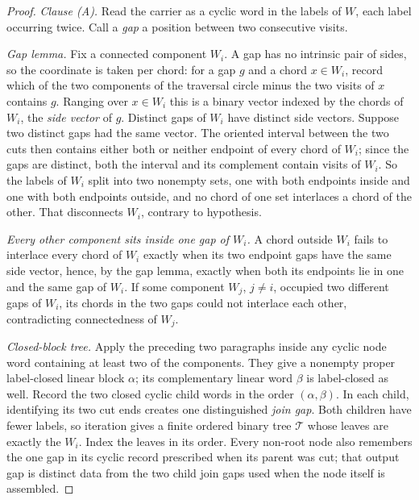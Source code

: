 \begin{proof}\leanok{}
\emph{Clause (A).}
Read the carrier as a cyclic word in the labels of $W$, each label occurring
twice. Call a \emph{gap} a position between two consecutive visits.

\emph{Gap lemma.} Fix a connected component $W_i$. A gap has no intrinsic pair
of sides, so the coordinate is taken per chord: for a gap $g$ and a chord
$x\in W_i$, record which of the two components of the traversal circle minus the
two visits of $x$ contains $g$. Ranging over $x\in W_i$ this is a binary vector
indexed by the chords of $W_i$, the \emph{side vector} of $g$. Distinct gaps of $W_i$ have
distinct side vectors. Suppose two distinct gaps had the same vector. The
oriented interval between the two cuts then contains either both or neither
endpoint of every chord of $W_i$; since the gaps are distinct, both the
interval and its complement contain visits of $W_i$. So the labels of $W_i$
split into two nonempty sets, one with both endpoints inside and one with both
endpoints outside, and no chord of one set interlaces a chord of the other.
That disconnects $W_i$, contrary to hypothesis.

\emph{Every other component sits inside one gap of $W_i$.} A chord outside
$W_i$ fails to interlace every chord of $W_i$ exactly when its two endpoint
gaps have the same side vector, hence, by the gap lemma, exactly when both its
endpoints lie in one and the same gap of $W_i$. If some component $W_j$,
$j\neq i$, occupied two different gaps of $W_i$, its chords in the two gaps
could not interlace each other, contradicting connectedness of $W_j$.

\emph{Closed-block tree.} Apply the preceding two paragraphs inside any
cyclic node word containing at least two of the components. They give a
nonempty proper label-closed linear block $\alpha$; its complementary linear
word $\beta$ is label-closed as well. Record the two closed cyclic child words
in the order $(\alpha,\beta)$. In each child, identifying its two cut ends
creates one distinguished \emph{join gap}. Both children have fewer labels,
so iteration gives a finite ordered binary tree $\mathcal T$ whose leaves are
exactly the $W_i$. Index the leaves in its order. Every non-root node also
remembers the one gap in its cyclic record prescribed when its parent was cut;
that output gap is distinct data from the two child join gaps used when the
node itself is assembled.


\end{proof}
